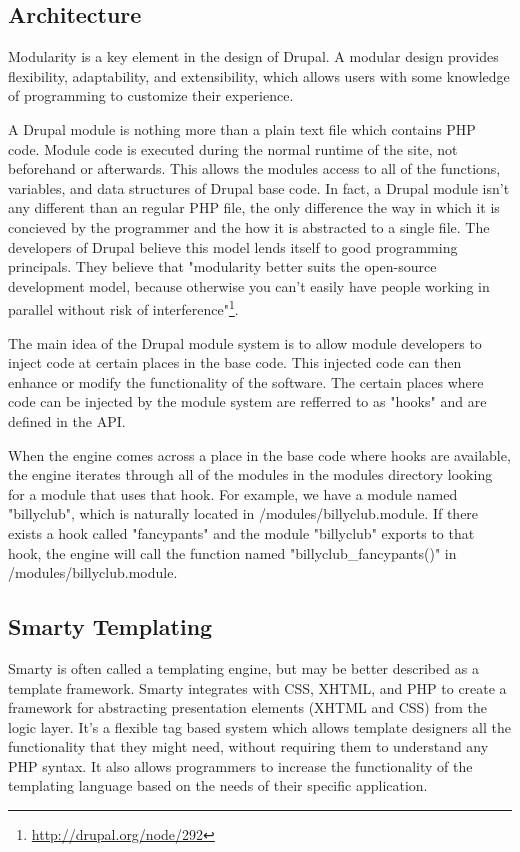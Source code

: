 \documentclass[a4paper,12pt]{report}
\begin{document}
\subsection {Architecture}
Modularity is a key element in the design of Drupal.
A modular design provides flexibility, adaptability, and extensibility, which allows users with some knowledge of programming to customize their experience.

A Drupal module is nothing more than a plain text file which contains PHP code. 
Module code is executed during the normal runtime of the site, not beforehand or afterwards. 
This allows the modules access to all of the functions, variables, and data structures of Drupal base code. 
In fact, a Drupal module isn't any different than an regular PHP file, the only difference the way in which it is concieved by the programmer and the how it is abstracted to a single file. 
The developers of Drupal believe this model lends itself to good programming principals. 
They believe that "modularity better suits the open-source development model, because otherwise you can't easily have people working in parallel without risk of interference"\footnote{\url{http://drupal.org/node/292}}. 


The main idea of the Drupal module system is to allow module developers to inject code at certain places in the base code. 
This injected code can then enhance or modify the functionality of the software. 
The certain places where code can be injected by the module system are refferred to as "hooks" and are defined in the API. 

When the engine comes across a place in the base code where hooks are available, the engine iterates through all of the modules in the modules directory looking for a module that uses that hook. 
For example, we have a module named "billyclub", which is naturally located in /modules/billyclub.module. If there exists a hook called "fancypants" and the module "billyclub" exports to that hook, the engine will call the function named "billyclub_fancypants()" in /modules/billyclub.module.


\subsection{Smarty Templating}
Smarty is often called a templating engine, but may be better described as a template framework. 
Smarty integrates with CSS, XHTML, and PHP to create a framework for abstracting presentation elements (XHTML and CSS) from the logic layer. 
It's a flexible tag based system which allows template designers all the functionality that they might need, without requiring them to understand any PHP syntax.
It also allows programmers to increase the functionality of the templating language based on the needs of their specific application. 
\end{document}
